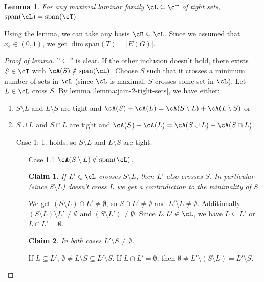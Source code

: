 \documentclass[11pt, a4paper]{article}
\newcommand{\mr}[1]{\mathrm{#1}}
\newcommand{\abs}[1]{\left\lvert#1\right\rvert}
\newtheorem{lemma}[theorem]{Lemma}
\newtheorem*{claim}{Claim}
\theoremstyle{remark}
\theoremstyle{definition}
\begin{document}
\begin{lemma}\label{lemma:jain-tight-laminar-span}
	For any maximal laminar family $\cL\subseteq\cT$ of tight sets,
	$\mr{span}(\cL)=\mr{span}(\cT)$.
\end{lemma}


Using the lemma, we can take any basis $\cB\subseteq\cL$. Since we assumed
that $x_e\in (0,1)$, we get $\dim \mathrm{span}(T)=\abs{E(G)}$.
\begin{proof}[Proof of lemma]
	''$\subseteq$'' is clear. If the other inclusion doesn't hold, there exists
	$S\in \cT$ with $\cA(S)\notin\mathrm{span}(\cL)$. Choose $S$ such that
	it crosses a minimum number of sets in $\cL$ (since $\cL$ is maximal, $S$
	crosses some set in $\cL$). Let $L\in\cL$ cross $S$. By lemma
	\ref{lemma:jain-2-tight-sets}, we have either:
	\begin{enumerate}
		\item $S\setminus L$ and $L\setminus S$ are tight and $\cA(S)+\cA(L)
		=\cA(S\setminus L)+\cA(L\setminus S)$ or

		\item $S\cup L$ and $S\cap L$ are tight and $\cA(S)+\cA(L)=\cA(S\cup L)
		+\cA(S\cap L)$.
	\end{enumerate}

	\begin{enumerate}
		\item[Case 1:] 1. holds, so $S\setminus L$ and $L\setminus S$ are tight.
		\begin{enumerate}
			\item[Case 1.1] $\cA(S\setminus L)\notin\mathrm{span}(\cL)$.
			\begin{claim}
				If $L'\in\cL$ crosses $S\setminus L$, then $L'$ also crosses $S$.
				In particular (since $S\setminus L$) doesn't cross $L$ we get a
				contradiction to the minimality of $S$.
			\end{claim}
			We get $(S\setminus L)\cap L'\neq\emptyset$, so $S\cap L'\neq\emptyset$
			and $L'\setminus L\neq\emptyset$. Additionally $(S\setminus L)
			\setminus L'\neq\emptyset$ and $(S\setminus L')\neq\emptyset$.
			Since $L,L'\in\cL$, we have $L\subseteq L'$ or $L\cap L'=\emptyset$.
			\begin{claim}
				In both cases $L'\setminus S\neq\emptyset$.
			\end{claim}
			If $L\subseteq L'$, $\emptyset\neq L\setminus S\subseteq L'\setminus S$.
			If $L\cap L'=\emptyset$, then $\emptyset\neq L'\setminus (S\setminus L)
			=L'\setminus S$.
		\end{enumerate}
	\end{enumerate}
\end{proof}
\end{document}
